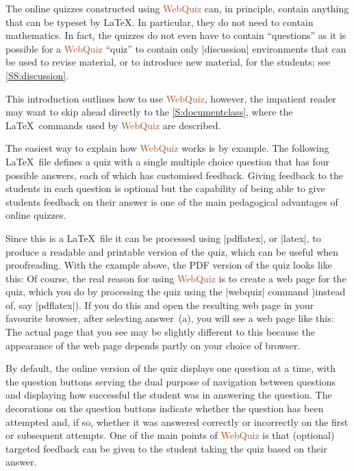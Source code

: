\documentclass[svgnames]{article}
\newcommand\WebQuiz{\textcolor{Sienna}{WebQuiz}\xspace}
\begin{document}
      The online quizzes constructed using \WebQuiz can, in principle,
      contain anything that can be typeset by \LaTeX. In particular, they
      do not need to contain mathematics. In fact, the quizzes do not even
      have to contain ``questions'' as it is possible for a \WebQuiz
      ``quiz'' to contain only \LaTeXCode|discussion| environments that can
      be used to revise material, or to introduce new material, for the
      students; see \autoref{SS:discussion}.

      This introduction outlines how to use \WebQuiz, however, the
      impatient reader may want to skip ahead directly to the
      \autoref{S:documentclass}, where the \LaTeX\ commands used by
      \WebQuiz are described.

      The easiest way to explain how \WebQuiz works is by example. The
      following \LaTeX\ file defines a quiz with a single multiple choice
      question that has four possible answers, each of which has
      customised feedback. Giving feedback to the students in each
      question is optional but the capability of being able to give
      students feedback on their answer is one of the main pedagogical
      advantages of online quizzes.


      Since this is a \LaTeX\ file it can be processed using
      \BashCode|pdflatex|, or \BashCode|latex|, to produce a readable and
      printable version of the quiz, which can be useful when
      proofreading. With the example above, the PDF version of the quiz looks
      like this:
      Of course, the real reason for using \WebQuiz is to create a
      web page for the quiz, which you do by processing the quiz using
      the \BashCode|webquiz| command )instead of, say
      \BashCode|pdflatex|). If you do this and open the resulting
      web page in your favourite browser, after selecting answer~(a), you
      will see a web page like this:
      The actual page that you see may be slightly different to
      this because the appearance of the web page depends partly on your
      choice of browser.

      By default, the online version of the quiz displays one question at
      a time, with the question buttons serving the dual purpose of
      navigation between questions and displaying how successful the
      student was in answering the question. The decorations on the
      question buttons indicate whether the question has been attempted
      and, if so, whether it was answered correctly or incorrectly on the
      first or subsequent attempts. One of the main points of \WebQuiz is
      that (optional) targeted feedback can be given to the student taking
      the quiz based on their answer.
\end{document}
